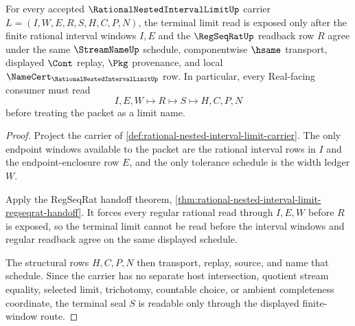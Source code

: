 \begin{theorem}
\label{thm:rational-nested-interval-limit-window-regularity}
For every accepted $\RationalNestedIntervalLimitUp$ carrier $L=(I,W,E,R,S,H,C,P,N)$, the terminal limit read is exposed only after the finite rational interval windows $I,E$ and the $\RegSeqRatUp$ readback row $R$ agree under the same $\StreamNameUp$ schedule, componentwise $\hsame$ transport, displayed $\Cont$ replay, $\Pkg$ provenance, and local $\NameCert_{\RationalNestedIntervalLimitUp}$ row. In particular, every Real-facing consumer must read
$$
I,E,W \longmapsto R \longmapsto S \longmapsto H,C,P,N
$$
before treating the packet as a limit name.
\end{theorem}
\begin{proof}
Project the carrier of \autoref{def:rational-nested-interval-limit-carrier}. The only endpoint windows available to the packet are the rational interval rows in $I$ and the endpoint-enclosure row $E$, and the only tolerance schedule is the width ledger $W$.

Apply the RegSeqRat handoff theorem, \autoref{thm:rational-nested-interval-limit-regseqrat-handoff}. It forces every regular rational read through $I,E,W$ before $R$ is exposed, so the terminal limit cannot be read before the interval windows and regular readback agree on the same displayed schedule.

The structural rows $H,C,P,N$ then transport, replay, source, and name that schedule. Since the carrier has no separate host intersection, quotient stream equality, selected limit, trichotomy, countable choice, or ambient completeness coordinate, the terminal seal $S$ is readable only through the displayed finite-window route.
\end{proof}


\begin{closurestatus}{\RationalNestedIntervalLimitUp}
  \theoryclosure{\seedClosure}
  \formalstatus{\unformalizedV}
\end{closurestatus}
